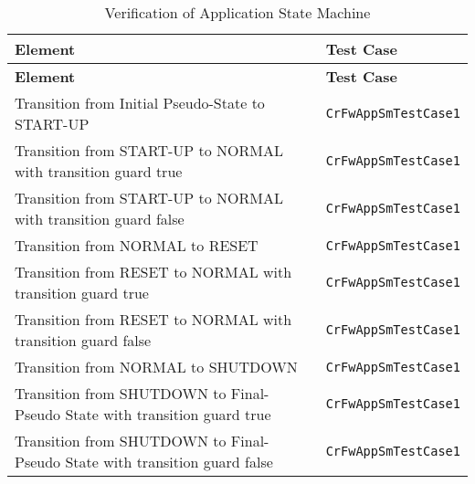 \documentclass{pnp_article}
\begin{document}
\begin{longtable}{|>{\raggedright}p{8.0cm}|P{5.0cm}|}
\caption{Verification of Application State Machine}
\label{tab:verAppSM}\\
\hline
{}
\textbf{Element} & \textbf{Test Case} \\
\hline
\endfirsthead
{}
\textbf{Element} & \textbf{Test Case} \\
\hline
\endhead
Transition from Initial Pseudo-State to START-UP  & \texttt{CrFwAppSmTestCase1}\\
\hline
Transition from START-UP to NORMAL with transition guard true  & \texttt{CrFwAppSmTestCase1}\\
\hline
Transition from START-UP to NORMAL with transition guard false  & \texttt{CrFwAppSmTestCase1}\\
\hline
Transition from NORMAL to RESET & \texttt{CrFwAppSmTestCase1}\\
\hline
Transition from RESET to NORMAL with transition guard true  & \texttt{CrFwAppSmTestCase1}\\
\hline
Transition from RESET to NORMAL with transition guard false  & \texttt{CrFwAppSmTestCase1}\\
\hline
Transition from NORMAL to SHUTDOWN & \texttt{CrFwAppSmTestCase1}\\
\hline
Transition from SHUTDOWN to Final-Pseudo State with transition guard true  & \texttt{CrFwAppSmTestCase1}\\
\hline
Transition from SHUTDOWN to Final-Pseudo State with transition guard false  & \texttt{CrFwAppSmTestCase1}\\
\end{longtable}
\end{document}
